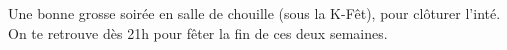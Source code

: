 Une bonne grosse soirée en salle de chouille (sous la K-Fêt), pour clôturer
l'inté. On te retrouve dès 21h pour fêter la fin de ces deux semaines.

